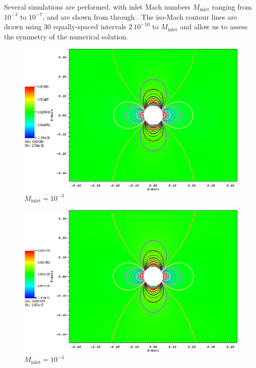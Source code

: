 Several simulations are performed, with inlet Mach numbers $M_{\text{inlet}}$ ranging from $10^{-3}$ to $10^{-7}$, and are shown from  through . The iso-Mach contour lines are drawn using 30 equally-spaced intervals $2 \ 10^{-10}$ to $M_{\text{inlet}}$ and allow us to assess the symmetry of the numerical solution.
%
        \begin{figure}[H]
                \centering
                \includegraphics[width=\textwidth]{figures/CylinderMach1em3ZoomIn.png}
                \caption{$M_{\text{inlet}}=10^{-3}$}
                \label{fig:cyl_1em3}
        \end{figure}%

        \begin{figure}[H]
                \centering
                \includegraphics[width=\textwidth]{figures/CylinderMach1em4ZoomIn.png}
                \caption{$M_{\text{inlet}}=10^{-4}$}
                \label{fig:cyl_1em4}
        \end{figure}    

